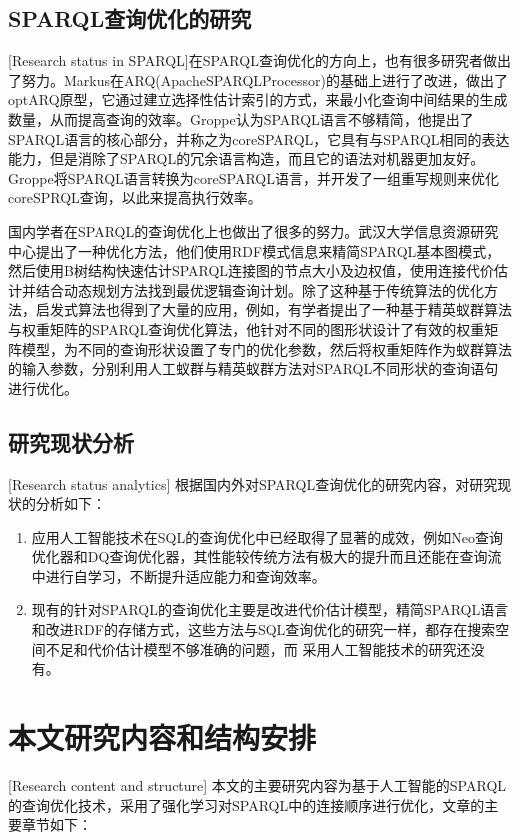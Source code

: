 \subsection{SPARQL查询优化的研究}[Research status in SPARQL]在SPARQL查询优化的方向上，也有很多研究者做出了努力。Markus在ARQ(ApacheSPARQLProcessor)的基础上进行了改进\cite{OptARQ}，做出了optARQ原型，它通过建立选择性估计索引的方式，来最小化查询中间结果的生成数量，从而提高查询的效率。Groppe认为SPARQL语言不够精简\cite{coreSPARQL}，他提出了SPARQL语言的核心部分，并称之为coreSPARQL，它具有与SPARQL相同的表达能力，但是消除了SPARQL的冗余语言构造，而且它的语法对机器更加友好。Groppe将SPARQL语言转换为coreSPARQL语言，并开发了一组重写规则来优化coreSPRQL查询，以此来提高执行效率。

国内学者在SPARQL的查询优化上也做出了很多的努力。武汉大学信息资源研究中心提出了一种优化方法\cite{XuLei}，他们使用RDF模式信息来精简SPARQL基本图模式，然后使用B树结构快速估计SPARQL连接图的节点大小及边权值，使用连接代价估计并结合动态规划方法找到最优逻辑查询计划。除了这种基于传统算法的优化方法，启发式算法也得到了大量的应用，例如，有学者提出了一种基于精英蚁群算法与权重矩阵的SPARQL查询优化算法\cite{精英蚁群}，他针对不同的图形状设计了有效的权重矩阵模型，为不同的查询形状设置了专门的优化参数，然后将权重矩阵作为蚁群算法的输入参数，分别利用人工蚁群与精英蚁群方法对SPARQL不同形状的查询语句进行优化。

\subsection{研究现状分析}[Research status analytics]
根据国内外对SPARQL查询优化的研究内容，对研究现状的分析如下：
\begin{enumerate}
    \item 应用人工智能技术在SQL的查询优化中已经取得了显著的成效，例如Neo查询优化器和DQ查询优化器，其性能较传统方法有极大的提升而且还能在查询流中进行自学习，不断提升适应能力和查询效率。
    \item 现有的针对SPARQL的查询优化主要是改进代价估计模型，精简SPARQL语言和改进RDF的存储方式，这些方法与SQL查询优化的研究一样，都存在搜索空间不足和代价估计模型不够准确的问题，而
    采用人工智能技术的研究还没有。
\end{enumerate}


\section{本文研究内容和结构安排}[Research content and structure]
本文的主要研究内容为基于人工智能的SPARQL的查询优化技术，采用了强化学习对SPARQL中的连接顺序进行优化，文章的主要章节如下：

